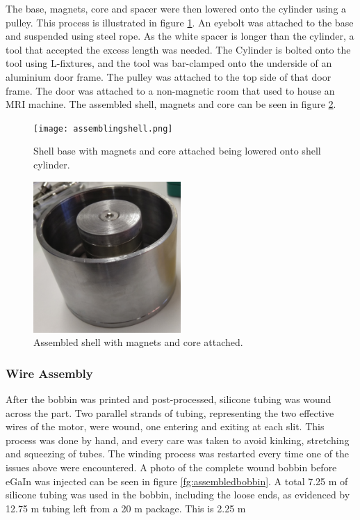 \documentclass[a4paper,12pt]{article}
\begin{document}
The base, magnets, core and spacer were then lowered onto the cylinder using a pulley. This process is illustrated in figure \ref{fg:assemblingshell}. An eyebolt was attached to the base and suspended using steel rope. As the white spacer is longer than the cylinder, a tool that accepted the excess length was needed. The Cylinder is bolted onto the tool using L-fixtures, and the tool was bar-clamped onto the underside of an aluminium door frame. The pulley was attached to the top side of that door frame. The door was attached to a non-magnetic room that used to house an MRI machine. The assembled shell, magnets and core can be seen in figure \ref{fg:assembledshell}.

\begin{figure}[h!]
    \centering
    \texttt{[image: assemblingshell.png]}
    \caption{Shell base with magnets and core attached being lowered onto shell cylinder.}
    \label{fg:assemblingshell}
\end{figure}

\begin{figure}[h!]
    \centering
    \includegraphics[width=0.5\textwidth]{assembledshell.jpg}
    \caption{Assembled shell with magnets and core attached.}
    \label{fg:assembledshell}
\end{figure}

\subsubsection{Wire Assembly}

After the bobbin was printed and post-processed, silicone tubing was wound across the part. Two parallel strands of tubing, representing the two effective wires of the motor, were wound, one entering and exiting at each slit. This process was done by hand, and every care was taken to avoid kinking, stretching and squeezing of tubes. The winding process was restarted every time one of the issues above were encountered. A photo of the complete wound bobbin before eGaIn was injected can be seen in figure \ref{fg:assembledbobbin}. A total 7.25 m of silicone tubing was used in the bobbin, including the loose ends, as evidenced by 12.75 m tubing left from a 20 m package. This is 2.25 m
\end{document}
